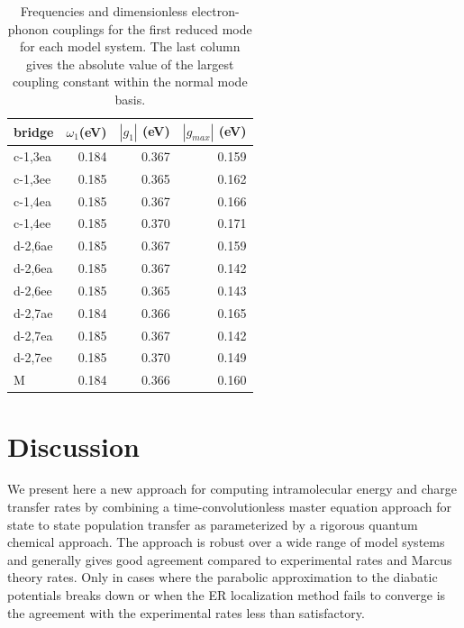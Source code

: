 \begin{table}[t]
\begin{centering}
\begin{tabular}{lrrr}
 bridge   &  $\omega_1$(eV)  & $|g_{1}|$ (eV)  &  $|g_{max}|$ (eV)  \\
\hline
\hline
 c-1,3ea  &           0.184  &         0.367  &           0.159  \\
 c-1,3ee  &           0.185  &         0.365  &           0.162  \\
 c-1,4ea  &           0.185  &         0.367  &           0.166  \\
 c-1,4ee  &           0.185  &         0.370  &           0.171  \\
 d-2,6ae  &           0.185  &         0.367  &           0.159  \\
 d-2,6ea  &           0.185  &         0.367  &           0.142  \\
 d-2,6ee  &           0.185  &         0.365  &           0.143  \\
 d-2,7ae  &           0.184  &         0.366  &           0.165  \\
 d-2,7ea  &           0.185  &         0.367  &           0.142  \\
 d-2,7ee  &           0.185  &         0.370  &           0.149  \\
 M           &           0.184  &         0.366  &           0.160  \\
 \hline
\end{tabular}
\end{centering}
\caption{Frequencies and dimensionless electron-phonon couplings for
the first reduced mode for each model system. The last column gives the
absolute value of the largest coupling constant within the normal mode basis.
}\label{table2}

\end{table}


\section{Discussion}

We present here a new approach for computing intramolecular energy and charge transfer rates
by combining a time-convolutionless master equation approach for state to state population transfer as parameterized
by  a rigorous quantum chemical approach.   The approach is robust over a wide range of model systems and
generally gives good agreement compared to experimental rates and Marcus theory rates.
Only in cases where the parabolic approximation to the diabatic potentials breaks down or when the ER localization method
fails to converge is the agreement with the experimental rates less than satisfactory.

